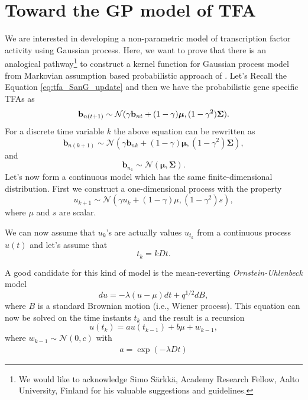 \section{Toward the GP model of TFA}\label{Sec:Toward_TFA}
We are interested in developing a non-parametric model of transcription factor activity using Gaussian process. Here, we want to prove that there is an analogical pathway\footnote{We would like to acknowledge Simo S\"arkk\"a, Academy Research Fellow, Aalto University, Finland for his valuable suggestions and guidelines.} to construct a kernel function for Gaussian process model from Markovian assumption based probabilistic approach of \cite{Sanguinetti:2006}. Let's Recall the Equation \ref{eq:tfa_SanG_update}  and then we have the probabilistic gene specific TFAs as
\begin{equation*} \label{eq:tfa_SanG_updateCh4}
\bold{b}_{n(t+1)} \sim \mathcal{N} (\gamma \bold{b}_{nt} + (1-\gamma)\boldsymbol{\mu},(1-\gamma^2)\bold{\Sigma}).
\end{equation*}
For a discrete time variable $k$ the above equation can be rewritten as
\begin{equation}
\textbf{b}_{n(k+1)} \sim \mathcal{N}\left(\gamma \textbf{b}_{nk} + (1 - \gamma) \boldsymbol{\mu}, (1 - \gamma^2) \boldsymbol{\Sigma}\right),
\end{equation}
and
\begin{equation}
\textbf{b}_{n_1} \sim \mathcal{N}\left(\boldsymbol{\mu}, \boldsymbol{\Sigma}\right).
\end{equation}
Let's now form a continuous model which has the same finite-dimensional distribution. First we construct a one-dimensional process with the property
\begin{equation}
u_{k+1} \sim \mathcal{N}\left(\gamma u_k + \left(1 - \gamma\right) \mu, (1 - \gamma^2)s \right),
\end{equation}
where $\mu$ and $s$ are scalar.

We can now assume that $u_k$'s are actually values $u_{t_k}$ from a continuous process $u(t)$ and let's assume that 
\begin{equation}
t_k = kDt.
\end{equation}

A good candidate for this kind of model is the mean-reverting \emph{Ornstein-Uhlenbeck} model \cite{Ornstein_Uhlenbeck:1930}
\begin{equation}\label{eq:OUP}
du = -\lambda \left(u - \mu\right) dt + q^{1/2} dB,
\end{equation}
where $B$ is a standard Brownian motion (i.e., Wiener process). This equation can now be solved on the time instants $t_k$ and the result is a recursion
\begin{equation}
u(t_k) = a u(t_{k-1}) + b \mu + w_{k-1},
\end{equation}
where $w_{k-1} \sim \mathcal{N}(0,c)$ with
\begin{equation*} \label{eq:a}
\begin{split}
a = \exp(-\lambda Dt)
\end{split}
\end{equation*}

